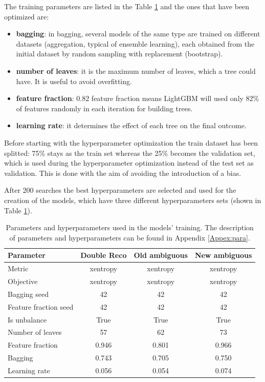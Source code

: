 \documentclass[a4paper, oneside, 11pt, openright]{book}
\begin{document}
				The training parameters are listed in the Table \ref{tab:parameters} and the ones that have been optimized are:
				\begin{itemize}
					\item \textbf{bagging}: in bagging, several models of the same type are trained on different datasets (aggregation, typical of ensemble learning), each obtained from the initial dataset by random sampling with replacement (bootstrap).
					\item \textbf{number of leaves}: it is the maximum number of leaves, which a tree could have. It is useful to avoid overfitting.
					\item \textbf{feature fraction}: 0.82 feature fraction means LightGBM will used only 82\% of features randomly in each iteration for building trees.
					\item \textbf{learning rate}: it determines the effect of each tree on the final outcome.
				\end{itemize}
				Before starting with the hyperparameter optimization the train dataset has been splitted: 75\% stays as the train set whereas the 25\% becomes the validation set, which is used during the hyperparameter optimization instead of the test set as validation. This is done with the aim of avoiding the introduction of a bias.
				
				After 200 searches the best hyperparameters are selected and used for the creation of the models, which have three different hyperparameters sets (shown in Table \ref{tab:parameters}).
				
				\begin{table}
					\centering
					\begin{tabular}{lccc}
						\toprule[1.5pt]
						\textbf{Parameter} & \textbf{Double Reco} & \textbf{Old ambiguous} & \textbf{New ambiguous} \\
						\midrule
						Metric & xentropy & xentropy & xentropy \\
						Objective & xentropy & xentropy & xentropy \\
						Bagging seed & 42  & 42 & 42 \\
						Feature fraction seed & 42 & 42 & 42 \\
						Is unbalance & True & True & True \\
						Number of leaves & 57 & 62 & 73 \\
						Feature fraction & 0.946 & 0.801 & 0.966 \\
						Bagging & 0.743 & 0.705 & 0.750 \\
						Learning rate & 0.056 & 0.054 & 0.074 \\
						\bottomrule[1.5pt]
					\end{tabular}
					\caption{Parameters and hyperparameters used in the models' training. The description of parameters and hyperparameters can be found in Appendix \ref{Appex:para}.}
					\label{tab:parameters} 
				\end{table}
		
\end{document}
